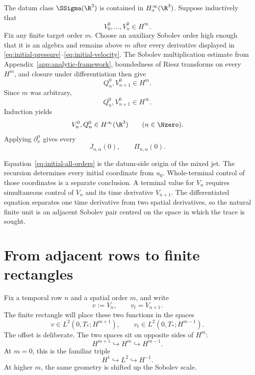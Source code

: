 The datum class \(\SSigma(\R^3)\) is contained in
\(H^\infty_\sigma(\R^3)\).  Suppose inductively that
\begin{equation*}
 V_0^0,\ldots,V_n^0\in H^\infty.
\end{equation*}
Fix any finite target order \(m\).  Choose an auxiliary Sobolev order high
enough that it is an algebra and remains above \(m\) after every derivative
displayed in \eqref{eq:initial-pressure}--\eqref{eq:initial-velocity}.  The
Sobolev multiplication estimate from
Appendix~\ref{app:analytic-framework}, boundedness of Riesz transforms on
every \(H^m\), and closure under differentiation then give
\begin{equation*}
 Q_n^0,V_{n+1}^0\in H^m.
\end{equation*}
Since \(m\) was arbitrary,
\begin{equation*}
 Q_n^0,V_{n+1}^0\in H^\infty.
\end{equation*}
Induction yields
\begin{equation}
 V_n^0,Q_n^0\in H^\infty(\R^3)
 \qquad(n\in\Nzero).
 \label{eq:initial-all-orders}
\end{equation}
Applying \(\partial_x^\alpha\) gives every
\begin{equation*}
 J_{n,\alpha}(0),
 \qquad
 \Pi_{n,\alpha}(0).
\end{equation*}

Equation~\eqref{eq:initial-all-orders} is the datum-side origin of the mixed
jet.  The recursion determines every initial coordinate from \(u_0\).
Whole-terminal control of those coordinates is a separate conclusion.  A
terminal value for \(V_n\)
requires simultaneous control of \(V_n\) and its time derivative
\(V_{n+1}\).  The differentiated equation separates one time derivative from
two spatial derivatives, so the natural finite unit is an adjacent Sobolev
pair centred on the space in which the trace is sought.

\section{From adjacent rows to finite rectangles}

Fix a temporal row \(n\) and a spatial order \(m\), and write
\begin{equation*}
 v:=V_n,
 \qquad
 v_t=V_{n+1}.
\end{equation*}
The finite rectangle will place these two functions in the spaces
\begin{equation}
 v\in L^2(0,T_*;H^{m+1}),
 \qquad
 v_t\in L^2(0,T_*;H^{m-1}).
 \label{eq:adjacent-pair-prototype}
\end{equation}
The offset is deliberate.  The two spaces sit on opposite sides of
\(H^m\):
\begin{equation*}
 H^{m+1}\hookrightarrow H^m\hookrightarrow H^{m-1}.
\end{equation*}
At \(m=0\), this is the familiar triple
\begin{equation*}
 H^1\hookrightarrow L^2\hookrightarrow H^{-1}.
\end{equation*}
At higher \(m\), the same geometry is shifted up the Sobolev scale.

